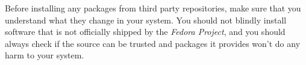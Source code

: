 Before installing any packages from third party repositories, make sure that you understand what they change in your system. You should not blindly install software that is not officially shipped by the \emph{Fedora Project}, and you should always check if the source can be trusted and packages it provides won't do any harm to your system.
\endinput
